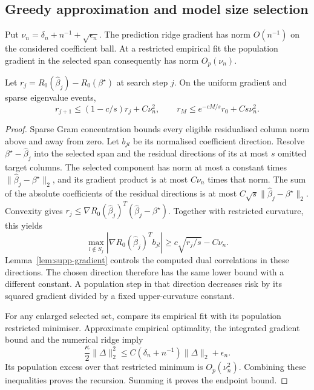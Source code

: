 \subsection{Greedy approximation and model size selection}

Put $\nu_n=\delta_n+n^{-1}+\sqrt{\epsilon_n}$. The prediction ridge
gradient has norm $O(n^{-1})$ on the considered coefficient ball.
At a restricted empirical fit the population gradient in the selected
span consequently has norm $O_p(\nu_n)$.

\begin{lemma}\label{lem:supp-greedy}
Let $r_j=R_0(\widehat\beta_j)-R_0(\beta^\star)$ at search step $j$.
On the uniform gradient and sparse eigenvalue events,
\begin{equation}\label{eq:supp-greedy-recursion}
 r_{j+1}\leq(1-c/s)r_j+C\nu_n^2,
 \qquad r_M\leq e^{-cM/s}r_0+Cs\nu_n^2.
\end{equation}
\end{lemma}

\begin{proof}
Sparse Gram concentration bounds every eligible residualised column
norm above and away from zero. Let $b_{jl}$ be its normalised
coefficient direction. Resolve $\beta^\star-\widehat\beta_j$ into
the selected span and the residual directions of its at most $s$
omitted target columns. The selected component has norm at most a
constant times $\|\widehat\beta_j-\beta^\star\|_2$, and its gradient
product is at most $C\nu_n$ times that norm. The sum of the absolute
coefficients of the residual directions is at most
$C\sqrt{s}\|\widehat\beta_j-\beta^\star\|_2$. Convexity gives
$r_j\leq\nabla R_0(\widehat\beta_j)^T
(\widehat\beta_j-\beta^\star)$. Together with restricted curvature,
this yields
\[
 \max_{l\notin S_j}|\nabla R_0(\widehat\beta_j)^Tb_{jl}|
       \geq c\sqrt{r_j/s}-C\nu_n.
\]
Lemma~\ref{lem:supp-gradient} controls the computed dual correlations
in these directions. The chosen direction therefore has the same
lower bound with a different constant. A population step in that
direction decreases risk by its squared gradient divided by a fixed
upper-curvature constant.

For any enlarged selected set, compare its empirical fit with its
population restricted minimiser. Approximate empirical optimality,
the integrated gradient bound and the numerical ridge imply
\[
 \frac\kappa2\|\Delta\|_2^2
       \leq C(\delta_n+n^{-1})\|\Delta\|_2+\epsilon_n.
\]
Its population excess over that restricted minimum is
$O_p(\nu_n^2)$. Combining these inequalities proves the recursion.
Summing it proves the endpoint bound.
\end{proof}

